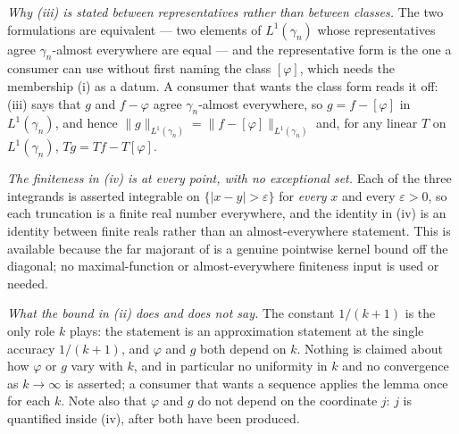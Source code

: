 \begin{lemma}
\emph{Why (iii) is stated between representatives rather than between
classes.}  The two formulations are equivalent --- two elements of
$L^1(\gamma_n)$ whose representatives agree $\gamma_n$-almost everywhere are
equal --- and the representative form is the one a consumer can use without
first naming the class $[\varphi]$, which needs the membership (i) as a datum.
A consumer that wants the class form reads it off: (iii) says that $g$ and
$f - \varphi$ agree $\gamma_n$-almost everywhere, so $g = f - [\varphi]$ in
$L^1(\gamma_n)$, and hence
$\|g\|_{L^1(\gamma_n)} = \|f - [\varphi]\|_{L^1(\gamma_n)}$ and, for any linear
$T$ on $L^1(\gamma_n)$, $Tg = Tf - T[\varphi]$.

\emph{The finiteness in (iv) is at every point, with no exceptional set.}
Each of the three integrands is asserted integrable on
$\{|x-y| > \varepsilon\}$ for \emph{every} $x$ and every $\varepsilon > 0$, so
each truncation is a finite real number everywhere, and the identity in (iv)
is an identity between finite reals rather than an almost-everywhere statement.
This is available because the far majorant of
 is a genuine pointwise kernel bound off
the diagonal; no maximal-function or almost-everywhere finiteness input is used
or needed.

\emph{What the bound in (ii) does and does not say.}  The constant $1/(k+1)$ is
the only role $k$ plays: the statement is an approximation statement at the
single accuracy $1/(k+1)$, and $\varphi$ and $g$ both depend on $k$.  Nothing
is claimed about how $\varphi$ or $g$ vary with $k$, and in particular no
uniformity in $k$ and no convergence as $k \to \infty$ is asserted; a consumer
that wants a sequence applies the lemma once for each $k$.  Note also that
$\varphi$ and $g$ do not depend on the coordinate $j$: $j$ is quantified
inside (iv), after both have been produced.
\end{lemma}
